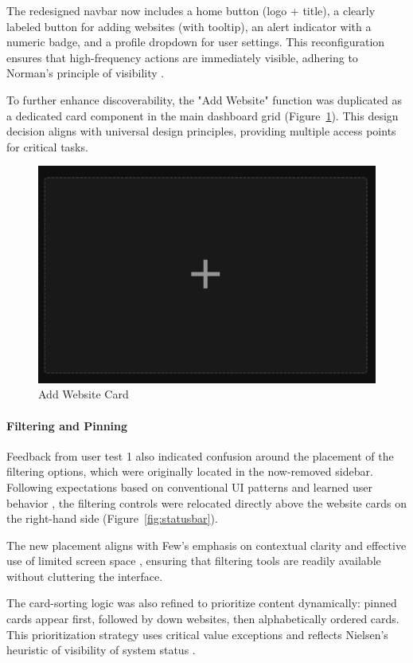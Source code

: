 The redesigned navbar now includes a home button (logo + title), a clearly labeled button for adding websites (with tooltip), an alert indicator with a numeric badge, and a profile dropdown for user settings. This reconfiguration ensures that high-frequency actions are immediately visible, adhering to Norman's principle of visibility \parencite{sharp-2019} .

To further enhance discoverability, the "Add Website" function was duplicated as a dedicated card component in the main dashboard grid (Figure~\ref{fig:addwebsitecard}). This design decision aligns with universal design principles, providing multiple access points for critical tasks.


\begin{figure}[H]
    \centering
    \includegraphics[width=0.5\linewidth]{figures/addwebsitecard.png}
    \caption{Add Website Card}
    \label{fig:addwebsitecard}
\end{figure}

\paragraph{Filtering and Pinning}
Feedback from user test 1 also indicated confusion around the placement of the filtering options, which were originally located in the now-removed sidebar. Following expectations based on conventional UI patterns and learned user behavior \parencite{Nielsen1994}, the filtering controls were relocated directly above the website cards on the right-hand side (Figure~\ref{fig:statusbar}).

The new placement aligns with Few’s emphasis on contextual clarity and effective use of limited screen space \parencite{FewDashboard}, ensuring that filtering tools are readily available without cluttering the interface. 

The card-sorting logic was also refined to prioritize content dynamically: pinned cards appear first, followed by down websites, then alphabetically ordered cards. This prioritization strategy uses critical value exceptions and reflects Nielsen's heuristic of visibility of system status \parencite{Nielsen1994}. 

